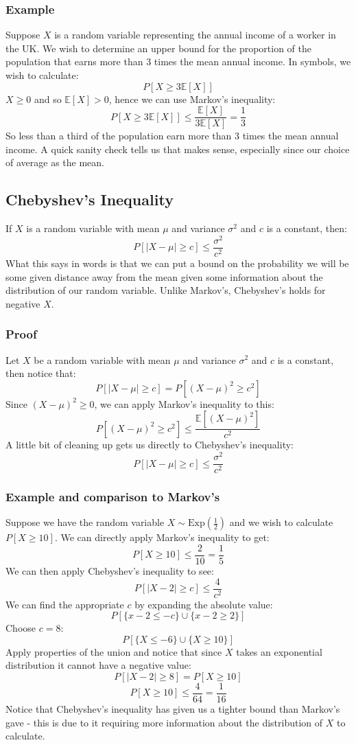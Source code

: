 \documentclass[12pt]{article}
\begin{document}
\subsubsection{Example}
Suppose \(X\) is a random variable representing the annual income of a worker in the UK. We wish to determine an upper bound for the proportion of the population that earns more than 3 times the mean annual income. In symbols, we wish to calculate:
\[P[X\geq 3\mathbb{E}[X]]\]
\(X\geq0\) and so \(\mathbb{E}[X]>0\), hence we can use Markov's inequality:
\[P[X\geq 3\mathbb{E}[X]]\leq \frac{\mathbb{E}[X]}{3\mathbb{E}[X]}=\frac{1}{3}\]
So less than a third of the population earn more than 3 times the mean annual income. A quick sanity check tells us that makes sense, especially since our choice of average as the mean.
\subsection{Chebyshev's Inequality}
If \(X\) is a random variable with mean \(\mu\) and variance \(\sigma^2\) and \(c\) is a constant, then:
\[P[|X-\mu|\geq c]\leq\frac{\sigma^2}{c^2}\]
What this says in words is that we can put a bound on the probability we will be some given distance away from the mean given some information about the distribution of our random variable. Unlike Markov's, Chebyshev's holds for negative \(X\).
\subsubsection{Proof}
Let \(X\) be a random variable with mean \(\mu\) and variance \(\sigma^2\) and \(c\) is a constant, then notice that:
\[P[|X-\mu|\geq c]=P[(X-\mu)^2\geq c^2]\]
Since \((X-\mu)^2\geq 0\), we can apply Markov's inequality to this:
\[P[(X-\mu)^2\geq c^2]\leq \frac{\mathbb{E}[(X-\mu)^2]}{c^2}\]
A little bit of cleaning up gets us directly to Chebyshev's inequality:
\[P[|X-\mu|\geq c]\leq\frac{\sigma^2}{c^2}\]
\subsubsection{Example and comparison to Markov's}
Suppose we have the random variable \(X\sim\text{Exp}\left(\frac{1}{2}\right)\) and we wish to calculate \(P[X\geq 10]\). We can directly apply Markov's inequality to get:
\[P[X\geq 10]\leq \frac{2}{10}=\frac{1}{5}\]
We can then apply Chebyshev's inequality to see:
\[P[|X-2|\geq c]\leq \frac{4}{c^2}\]
We can find the appropriate \(c\) by expanding the absolute value:
\[P[\{x-2\leq -c\}\cup\{x-2\geq 2\}]\]
Choose \(c=8\):
\[P[\{X\leq-6\}\cup\{X\geq 10\}]\]
Apply properties of the union and notice that since \(X\) takes an exponential distribution it cannot have a negative value:
\[P[|X-2|\geq 8]=P[X\geq 10]\]
\[P[X\geq 10]\leq \frac{4}{64}=\frac{1}{16}\]
Notice that Chebyshev's inequality has given us a tighter bound than Markov's gave - this is due to it requiring more information about the distribution of \(X\) to calculate.
\end{document}
